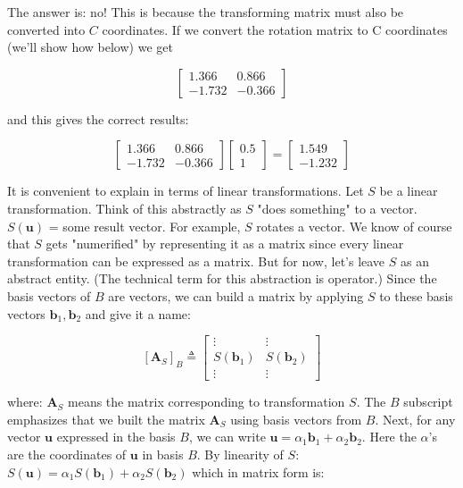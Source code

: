 \documentclass[main.tex]{subfiles}
\begin{document}
    The answer is: no! This is because the transforming matrix must also be converted into $C$ coordinates. If we convert the rotation matrix to C coordinates (we'll show how below) we get
    
    $$
    \left[\begin{array}{cc}
    1.366 & 0.866 \\
    -1.732 & -0.366
    \end{array}\right]
    $$
    
    and this gives the correct results:
    
    $$
    \left[\begin{array}{cc}
    1.366 & 0.866 \\
    -1.732 & -0.366
    \end{array}\right]\left[\begin{array}{r}
    0.5 \\
    1
    \end{array}\right]=\left[\begin{array}{r}
    1.549 \\
    -1.232
    \end{array}\right]
    $$

    It is convenient to explain in terms of linear transformations. Let $S$ be a linear transformation. Think of this abstractly as $S$ "does something" to a vector. $S(\mathbf{u})$ = some result vector. For example, $S$ rotates a vector. We know of course that $S$ gets "numerified" by representing it as a matrix since every linear transformation can be expressed as a matrix. But for now, let's leave $S$ as an abstract entity. (The technical term for this abstraction is operator.) Since the basis vectors of $B$ are vectors, we can build a matrix by applying $S$ to these basis vectors $\mathbf{b}_{1}, \mathbf{b}_{2}$ and give it a name: 
    
    $$
    \left[\mathbf{A}_{S}\right]_{B} \triangleq\left[\begin{array}{cc}
    \vdots & \vdots \\
    S\left(\mathbf{b}_{1}\right) & S\left(\mathbf{b}_{2}\right) \\
    \vdots & \vdots
    \end{array}\right]
    $$
    
    where: $\mathbf{A}_{S}$ means the matrix corresponding to transformation $S$. The $B$ subscript emphasizes that we built the matrix $\mathbf{A}_{S}$ using basis vectors from $B$. Next, for any vector $\mathbf{u}$ expressed in the basis $B$, we can write $\mathbf{u}=\alpha_{1} \mathbf{b}_{1}+\alpha_{2} \mathbf{b}_{2}$. Here the $\alpha$'s are the coordinates of $\mathbf{u}$ in basis $B$. By linearity of $S$: $S(\mathbf{u})=\alpha_{1} S\left(\mathbf{b}_{1}\right)+\alpha_{2} S\left(\mathbf{b}_{2}\right)$ which in matrix form is:
    
\end{document}
